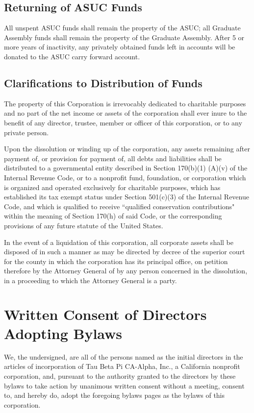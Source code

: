 \documentclass{article}
\begin{document}
	\subsection{Returning of ASUC Funds}
	All unspent ASUC funds shall remain the property of the ASUC; all Graduate Assembly funds shall remain the property of the Graduate Assembly. After 5 or more years of inactivity, any privately obtained funds left in accounts will be donated to the ASUC carry forward account.
	\subsection{Clarifications to Distribution of Funds}
	The property of this Corporation is irrevocably dedicated to charitable purposes and no part of the net income or assets of the corporation shall ever inure to the benefit of any director, trustee, member or officer of this corporation, or to any private person. 
	
	Upon the dissolution or winding up of the corporation, any assets remaining after payment of, or provision for payment of, all debts and liabilities shall be distributed to a governmental entity described in Section 170(b)(1) (A)(v) of the Internal Revenue Code, or to a nonprofit fund, foundation, or corporation which is organized and operated exclusively for charitable purposes, which has established its tax exempt status under Section 501(c)(3) of the Internal Revenue Code, and which is qualified to receive ``qualified conservation contributions" within the meaning of Section 170(h) of said Code, or the corresponding provisions of any future statute of the United States.
	
	In the event of a liquidation of this corporation, all corporate assets shall be disposed of in such a manner as may be directed by decree of the superior court for the county in which the corporation has its principal office, on petition therefore by the Attorney General of by any person concerned in the dissolution, in a proceeding to which the Attorney General is a party.
	\pagebreak
\section*{Written Consent of Directors Adopting Bylaws}
	We, the undersigned, are all of the persons named as the initial directors in the articles of incorporation of Tau Beta Pi CA-Alpha, Inc., a California nonprofit corporation, and, pursuant to the authority granted to the directors by these bylaws to take action by unanimous written consent without a meeting, consent to, and hereby do, adopt the foregoing bylaws pages as the bylaws of this corporation.
	
\end{document}
